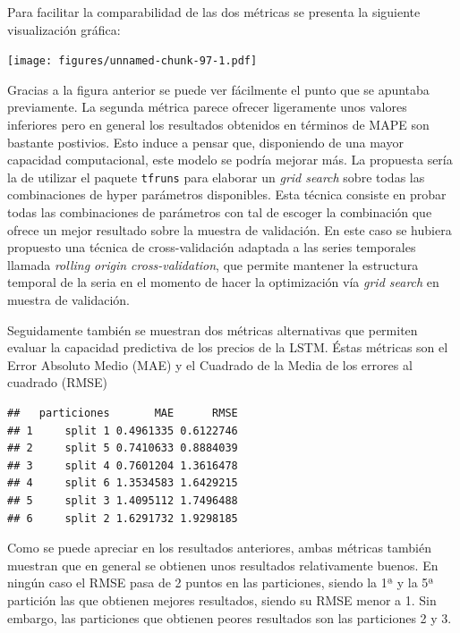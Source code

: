 \documentclass[]{DissertateUSU}
\begin{document}
\noindent Para facilitar la comparabilidad de las dos métricas se
presenta la siguiente visualización gráfica:

\texttt{[image: figures/unnamed-chunk-97-1.pdf]} \centering
{}

\setlength\parskip{5ex}
\justifying

\noindent Gracias a la figura anterior se puede ver fácilmente el punto
que se apuntaba previamente. La segunda métrica parece ofrecer
ligeramente unos valores inferiores pero en general los resultados
obtenidos en términos de MAPE son bastante postivios. Esto induce a
pensar que, disponiendo de una mayor capacidad computacional, este
modelo se podría mejorar más. La propuesta sería la de utilizar el
paquete \texttt{tfruns} para elaborar un \emph{grid search} sobre todas
las combinaciones de hyper parámetros disponibles. Esta técnica consiste
en probar todas las combinaciones de parámetros con tal de escoger la
combinación que ofrece un mejor resultado sobre la muestra de
validación. En este caso se hubiera propuesto una técnica de
cross-validación adaptada a las series temporales llamada \emph{rolling
origin cross-validation}, que permite mantener la estructura temporal de
la seria en el momento de hacer la optimización vía \emph{grid search}
en muestra de validación.

\noindent Seguidamente también se muestran dos métricas alternativas que
permiten evaluar la capacidad predictiva de los precios de la LSTM.
Éstas métricas son el Error Absoluto Medio (MAE) y el Cuadrado de la
Media de los errores al cuadrado (RMSE)

\begin{verbatim}
##   particiones       MAE      RMSE
## 1     split 1 0.4961335 0.6122746
## 2     split 5 0.7410633 0.8884039
## 3     split 4 0.7601204 1.3616478
## 4     split 6 1.3534583 1.6429215
## 5     split 3 1.4095112 1.7496488
## 6     split 2 1.6291732 1.9298185
\end{verbatim}

\noindent Como se puede apreciar en los resultados anteriores, ambas
métricas también muestran que en general se obtienen unos resultados
relativamente buenos. En ningún caso el RMSE pasa de 2 puntos en las
particiones, siendo la 1ª y la 5ª partición las que obtienen mejores
resultados, siendo su RMSE menor a 1. Sin embargo, las particiones que
obtienen peores resultados son las particiones 2 y 3.
\end{document}
